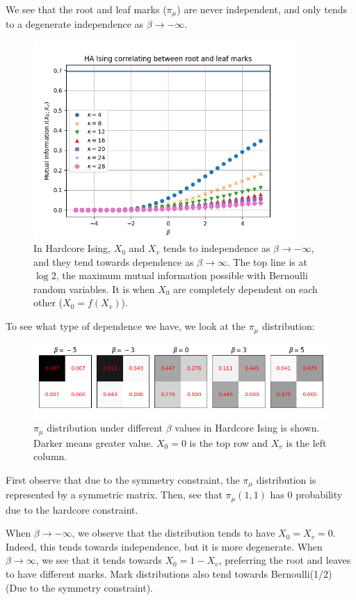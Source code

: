 \documentclass[12pt]{article}
\numberwithin{equation}{section}
\begin{document}
We see that the root and leaf marks ($\pi_\mu$) are never independent, and only tends to a degenerate independence as $\beta\rightarrow-\infty$.
\begin{figure}[h]
    \centering
    \includegraphics[width=10cm]{img/HA_Ising/RL_indep.png}
    \caption{In Hardcore Ising, $X_0$ and $X_v$ tends to independence as $\beta\rightarrow-\infty$, and they tend towards dependence as $\beta\rightarrow\infty$. The top line is at $\log 2$, the maximum mutual information possible with Bernoulli random variables.
        It is when $X_0$ are completely dependent on each other ($X_0=f(X_v)$).}
    \label{Fig.HAIS-RL-indep}
\end{figure}

To see what type of dependence we have, we look at the $\pi_\mu$ distribution:
\begin{figure}[h]
    \centering
    \includegraphics[width=15cm]{img/HA_Ising/RL_indiv.png}
    \caption{$\pi_\mu$ distribution under different $\beta$ values in Hardcore Ising is shown. Darker means greater value. $X_0=0$ is the top row and $X_v$ is the left column.}
    \label{Fig.HAIS-RL-beta-trends}
\end{figure}

First observe that due to the symmetry constraint, the $\pi_\mu$ distribution is represented by a symmetric matrix. Then, see that $\pi_\mu(1, 1)$ has $0$ probability due to the hardcore constraint.

When $\beta\rightarrow-\infty$, we observe that the distribution tends to have $X_0=X_v=0$. Indeed, this tends towards independence, but it is more
degenerate. When $\beta\rightarrow\infty$, we see that it tends towards $X_0=1-X_v$, preferring the root and leaves to have different marks.
Mark distributions also tend towards Bernoulli(1/2) (Due to the symmetry constraint).
\end{document}
